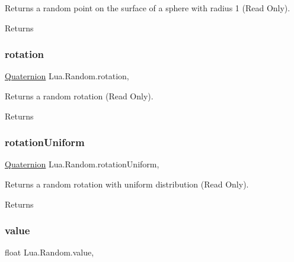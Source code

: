 Returns a random point on the surface of a sphere with radius 1 (Read Only). 

\begin{DoxyReturn}{Returns}

\end{DoxyReturn}
\mbox{\label{class_lua_1_1_random_a2705c860d3280bb5e5d0593d59fad8e3}} 
\subsubsection{\texorpdfstring{rotation}{rotation}}
{\footnotesize\ttfamily \mbox{\hyperlink{class_lua_1_1_quaternion}{Quaternion}} Lua.\+Random.\+rotation\hspace{0.3cm}{\ttfamily [static]}, {\ttfamily [get]}}



Returns a random rotation (Read Only). 

\begin{DoxyReturn}{Returns}

\end{DoxyReturn}
\mbox{\label{class_lua_1_1_random_a99f73343c5e319aff692abcca2ca51a1}} 
\subsubsection{\texorpdfstring{rotationUniform}{rotationUniform}}
{\footnotesize\ttfamily \mbox{\hyperlink{class_lua_1_1_quaternion}{Quaternion}} Lua.\+Random.\+rotation\+Uniform\hspace{0.3cm}{\ttfamily [static]}, {\ttfamily [get]}}



Returns a random rotation with uniform distribution (Read Only). 

\begin{DoxyReturn}{Returns}

\end{DoxyReturn}
\mbox{\label{class_lua_1_1_random_a058b72bbd12cd2d665b14d0479b52ad7}} 
\subsubsection{\texorpdfstring{value}{value}}
{\footnotesize\ttfamily float Lua.\+Random.\+value\hspace{0.3cm}{\ttfamily [static]}, {\ttfamily [get]}}



